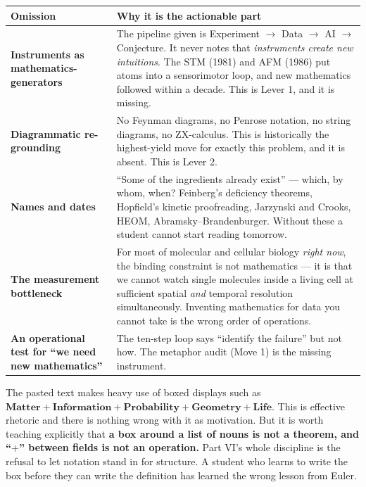 \begin{center}\small
\begin{tabular}{@{}>{\raggedright\arraybackslash}p{5.3cm}>{\raggedright\arraybackslash}p{11.4cm}@{}}
\toprule
\rowcolor{ember!12}
\textbf{\color{ember}Omission} & \textbf{\color{ember}Why it is the actionable part}\\
\midrule
\textbf{Instruments as mathematics-generators} &
 The pipeline given is Experiment $\to$ Data $\to$ AI $\to$ Conjecture. It never notes that
 \emph{instruments create new intuitions}. The STM (1981) and AFM (1986) put atoms into a
 sensorimotor loop, and new mathematics followed within a decade. This is Lever 1, and it is missing.\\
\textbf{Diagrammatic re-grounding} &
 No Feynman diagrams, no Penrose notation, no string diagrams, no ZX-calculus. This is historically
 the highest-yield move for exactly this problem, and it is absent. This is Lever 2.\\
\textbf{Names and dates} &
 ``Some of the ingredients already exist'' --- which, by whom, when? Feinberg's deficiency theorems,
 Hopfield's kinetic proofreading, Jarzynski and Crooks, HEOM, Abramsky--Brandenburger. Without these
 a student cannot start reading tomorrow.\\
\rowcolor{crimson!7}
\textbf{The measurement bottleneck} &
 For most of molecular and cellular biology \emph{right now}, the binding constraint is not
 mathematics --- it is that we cannot watch single molecules inside a living cell at sufficient
 spatial \emph{and} temporal resolution simultaneously. Inventing mathematics for data you cannot
 take is the wrong order of operations.\\
\textbf{An operational test for ``we need new mathematics''} &
 The ten-step loop says ``identify the failure'' but not how. The metaphor audit (Move 1) is the
 missing instrument.\\
\bottomrule
\end{tabular}
\end{center}

\begin{warmbox}[title={A note on style, offered for your students' sake}]
The pasted text makes heavy use of boxed displays such as
$\boxed{\textbf{Matter}+\textbf{Information}+\textbf{Probability}+\textbf{Geometry}+\textbf{Life}}$.
This is effective rhetoric and there is nothing wrong with it as motivation. But it is worth teaching
explicitly that \textbf{a box around a list of nouns is not a theorem, and ``$+$'' between fields is
not an operation.} Part VI's whole discipline is the refusal to let notation stand in for structure.
A student who learns to write the box before they can write the definition has learned the wrong
lesson from Euler.
\end{warmbox}
